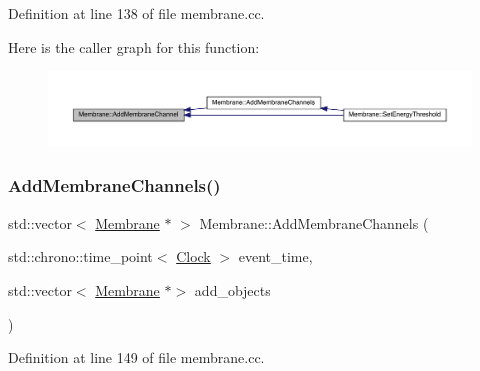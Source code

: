 Definition at line 138 of file membrane.\+cc.

Here is the caller graph for this function\+:
\nopagebreak
\begin{figure}[H]
\begin{center}
\leavevmode
\includegraphics[width=350pt]{class_membrane_a3e3b4f55f028541e7513f826d01a689a_icgraph}
\end{center}
\end{figure}
\mbox{\label{class_membrane_aab591875e3266d6c5af0f7c5f7f21e8f}} 
\subsubsection{\texorpdfstring{Add\+Membrane\+Channels()}{AddMembraneChannels()}}
{\footnotesize\ttfamily std\+::vector$<$ \hyperlink{class_membrane}{Membrane} $\ast$ $>$ Membrane\+::\+Add\+Membrane\+Channels (\begin{DoxyParamCaption}\item[{std\+::chrono\+::time\+\_\+point$<$ \hyperlink{universe_8h_a0ef8d951d1ca5ab3cfaf7ab4c7a6fd80}{Clock} $>$}]{event\+\_\+time,  }\item[{std\+::vector$<$ \hyperlink{class_membrane}{Membrane} $\ast$$>$}]{add\+\_\+objects }\end{DoxyParamCaption})}



Definition at line 149 of file membrane.\+cc.


